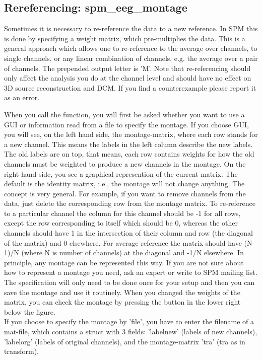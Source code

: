 \subsection{Rereferencing: spm\_eeg\_montage}
Sometimes it is necessary to re-reference the data to a new
reference. In SPM this is done by specifying a weight matrix, which 
pre-multiplies the data. This is a general approach which 
allows one to re-reference to the average over channels, to single
channels, or any linear combination of channels, e.g. the average over
a pair of channels. The prepended output letter is 'M'. Note that re-referencing
should only affect the analysis you do at the channel level and should have no effect
on 3D source reconstruction and DCM. If you find a counterexample please report
it as an error.

When you call the function, you will first be asked whether you want 
to use a GUI or information read from a file to specify the montage. 
If you choose GUI, you will see, on the left hand side, the montage-matrix,
where each row stands for a new channel. This means the labels in the left 
column describe the new labels. The old labels are on top, that means, each 
row contains weights for how the old channels must be weighted to produce a new 
channels in the montage. On the right hand side, you see a graphical represention 
of the current matrix. The default is the identity matrix, i.e., the montage will
not change anything. The concept is very general. For example, if you want to 
remove channels from the data, just delete the corresponding row from the montage matrix.
To re-reference to a particular channel the column for this channel should be -1 for
all rows, except the row corresponding to itself which should be 0, whereas the other channels 
should have 1 in the intersection of their column and row (the diagonal of the matrix) and 0 elsewhere.
For average reference the matrix should have (N-1)/N (where N is number of channels) at the diagonal and -1/N elsewhere.
In principle, any montage can be represented this way. If you are not sure about how to represent a montage you need,
ask an expert or write to SPM mailing list. The specification will only need to be done once for your setup and then you can
save the montage and use it routinely. When you changed the weights of the matrix, you can check the montage by pressing 
the button in the lower right below the figure.
\\
If you choose to specify the montage by 'file', you have to enter the filename of a mat-file, 
which contains a struct with 3 fields: 'labelnew' (labels of new channels), 'labelorg' (labels of original channels), 
and the montage-matrix 'tra' (tra as in transform).


